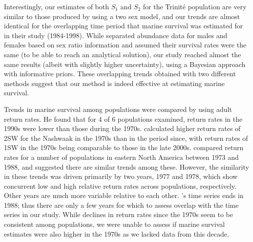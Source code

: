 \documentclass[12pt]{article}
\newcommand{\So}{$S_{1}$\xspace}
\newcommand{\St}{$S_{2}$\xspace}
\begin{document}

Interestingly, our estimates of both \So and \St for the Trinit\'{e}
population are very similar to those produced by \citet{Chaput2003b} using a
two sex model, and our trends are almost identical for the overlapping time
period that marine survival was estimated for in their study (1984-1998). 
While \citet{Chaput2003b} separated abundance data for males and females
based on sex ratio information and assumed their survival rates were the 
same (to be able to reach an analytical solution), our study reached almost the same results (albeit with
slightly higher uncertainty), using a Bayesian approach with informative
priors. These overlapping trends obtained with two different methods 
suggest that our method is indeed effective at estimating marine survival.


Trends in marine survival
among populations were compared by \citet{Chaput2012a} using adult return rates.
He found that for 4 of 6 populations examined, return rates in the 1990s 
were lower than those during the 1970s.
\citet{Gibson2016} calculated higher return rates of 2SW for the Nashwaak in
the 1970s than in the period since, with return rates of 1SW in the 1970s
being comparable to those in the late 2000s.
\citet{Friedland1993} compared return rates for a number of populations in eastern
North America between 1973 and 1988, and suggested there are similar trends among these. 
However, the similarity in these trends was driven primarily by two years, 1977 and 1978, which
show concurrent low and high relative return rates across populations,
respectively. Other years are much more variable relative to each other.
\citeauthor{Friedland1993}'s \citeyear{Friedland1993} time series ends in  
1988; thus there are only a few years for which to assess overlap with the
time series in our study.
While declines in return rates since the 1970s seem to be consistent among populations, 
we were unable to assess if marine survival estimates were also higher in the 1970s as we lacked 
data from this decade.
\end{document}
